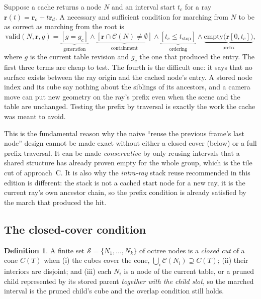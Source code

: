\documentclass[11pt,a4paper]{article}
\newcommand{\vect}[1]{\mathbf{#1}}
\newcommand{\cube}{\mathcal{C}}
\theoremstyle{plain}
\theoremstyle{definition}
\newtheorem{definition}{Definition}
\theoremstyle{remark}
\begin{document}
Suppose a cache returns a node $N$ and an interval start $t_c$ for a ray
$\vect{r}(t)=\vect{r}_o+t\vect{r}_d$. A necessary and sufficient condition for
marching from $N$ to be as correct as marching from the root is
\begin{equation}
\label{eq:valid}
\mathrm{valid}(N,\vect{r},g) =
\underbrace{[g=g_c]}_{\text{generation}}
\land
\underbrace{[\vect{r}\cap\cube(N)\neq\emptyset]}_{\text{containment}}
\land
\underbrace{[t_c\le t_{\text{stop}}]}_{\text{ordering}}
\land
\underbrace{\mathrm{empty}\bigl(\vect{r}[0,t_c]\bigr)}_{\text{prefix}} ,
\end{equation}
where $g$ is the current table revision and $g_c$ the one that produced the
entry. The first three terms are cheap to test. The fourth is the difficult
one: it says that no surface exists between the ray origin and the cached
node's entry. A stored node index and its cube say nothing about the siblings
of its ancestors, and a camera move can put new geometry on the ray's prefix
even when the scene and the table are unchanged. Testing the prefix by
traversal is exactly the work the cache was meant to avoid.

This is the fundamental reason why the naive ``reuse the previous frame's last
node'' design cannot be made exact without either a closed cover (below) or a
full prefix traversal. It can be made \emph{conservative} by only reusing
intervals that a shared structure has already proven empty for the whole group,
which is the tile cut of approach~C. It is also why the \emph{intra-ray}
stack reuse recommended in this edition is different: the stack is not a cached
start node for a new ray, it is the current ray's own ancestor chain, so the
prefix condition is already satisfied by the march that produced the hit.

\subsection{The closed-cover condition}

\begin{definition}
A finite set $\mathcal{S}=\{N_1,\dots,N_k\}$ of octree nodes is a
\emph{closed cut} of a cone $C(T)$ when (i) the cubes cover the cone,
$\bigcup_i \cube(N_i)\supseteq C(T)$; (ii) their interiors are disjoint; and
(iii) each $N_i$ is a node of the current table, or a pruned child represented
by its stored parent \emph{together with the child slot}, so the marched
interval is the pruned child's cube and the overlap condition still holds.
\end{definition}
\end{document}
